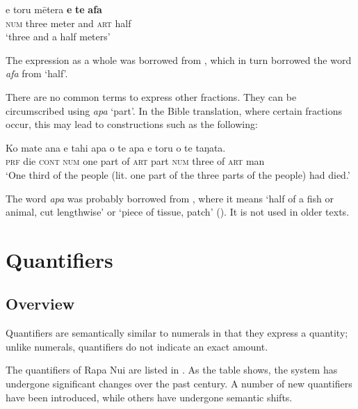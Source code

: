 \ea\label{ex:4.47}
\gll e toru mētera \textbf{{\ꞌ}e} \textbf{te} \textbf{{\ꞌ}afa} \\
\textsc{num} three meter and \textsc{art} half \\

\glt
‘three and a half meters’ \textstyleExampleref{[Notes]}
\z

The expression as a whole was borrowed from , which in turn borrowed the word \textit{{\ꞌ}afa} from  ‘half’.

There are no common terms to express other fractions. They can be circumscribed using \textit{{\ꞌ}apa} ‘part’. In the Bible translation, where certain fractions occur, this may lead to constructions such as the following:

\ea\label{ex:4.48}
\gll Ko mate {\ꞌ}ana e tahi {\ꞌ}apa o te {\ꞌ}apa e toru o te taŋata. \\
\textsc{prf} die \textsc{cont} \textsc{num} one part of \textsc{art} part \textsc{num} three of \textsc{art} man \\

\glt
‘One third of the people (lit. one part of the three parts of the people) had died.’ \textstyleExampleref{[Rev. 9:20]}
\z

The word \textit{{\ꞌ}apa} was probably borrowed from , where it means ‘half of a fish or animal, cut lengthwise’ or ‘piece of tissue, patch’ (\citealt[49]{AcadémieTahitienne1999}). It is not used in older texts.

\section{Quantifiers}\label{sec:4.4}
\subsection{Overview}\label{sec:4.4.1}

Quantifiers are semantically similar to numerals in that they express a quantity; unlike numerals, quantifiers do not indicate an exact amount. 

The quantifiers of Rapa Nui are listed in . As the table shows, the  system has undergone significant changes over the past century. A number of new quantifiers have been introduced, while others have undergone semantic shifts. 

